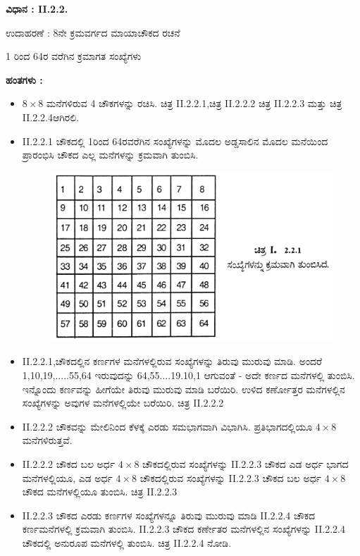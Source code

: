 \noindent \textbf{ವಿಧಾನ : II.2.2.}

ಉದಾಹರಣೆ : 8ನೇ ಕ್ರಮವರ್ಗದ ಮಾಯಾಚೌಕದ ರಚನೆ

1 ರಿಂದ 64ರ ವರೆಗಿನ ಕ್ರಮಾಗತ ಸಂಖ್ಯೆಗಳು

\textbf{ಹಂತಗಳು :}
\begin{itemize}
	\item $8 \times 8$ ಮನೆಗಳಿರುವ 4 ಚೌಕಗಳನ್ನು ರಚಿಸಿ. ಚಿತ್ರ II.2.2.1,ಚಿತ್ರ II.2.2.2 ಚಿತ್ರ II.2.2.3 ಮತ್ತು ಚಿತ್ರ II.2.2.4ಆಗಿರಲಿ.
	\item II.2.2.1 ಚೌಕದಲ್ಲಿ 1ರಿಂದ 64ರವರೆಗಿನ ಸಂಖ್ಯೆಗಳನ್ನು ಮೊದಲ ಅಡ್ಡಸಾಲಿನ \linebreak ಮೊದಲ ಮನೆಯಿಂದ ಪ್ರಾರಂಭಿಸಿ ಚೌಕದ ಎಲ್ಲ ಮನೆಗಳನ್ನು ಕ್ರಮವಾಗಿ ತುಂಬಿಸಿ.
	\begin{figure}[H]
	\includegraphics{src/figures/chap3/fig3-20.jpg}
	\end{figure}
	\item II.2.2.1,ಚೌಕದಲ್ಲಿನ ಕರ್ಣಗಳ ಮನೆಗಳಲ್ಲಿರುವ ಸಂಖ್ಯೆಗಳನ್ನು ತಿರುವು ಮುರುವು ಮಾಡಿ. ಅಂದರೆ 1,10,19,.....55,64 ಇರುವುದನ್ನು 64,55....19.10,1 ಆಗುವಂತೆ - ಅದೇ ಕರ್ಣದ ಮನೆಗಳಲ್ಲಿ ತುಂಬಿಸಿ. ಇನ್ನೊಂದು ಕರ್ಣವನ್ನು ಹೀಗೆಯೇ ತಿರುವು ಮುರುವು ಮಾಡಿ ಬರೆಯಿರಿ. ಉಳಿದ ಕರ್ಣೋತ್ತರ ಮನೆಗಳಲ್ಲಿನ \linebreak ಸಂಖ್ಯೆಗಳನ್ನು ಅವುಗಳ ಮನೆಗಳಲ್ಲಿಯೇ ಬರೆಯಿರಿ. ಚಿತ್ರ II.2.2.2
	\item II.2.2.2 ಚೌಕವನ್ನು ಮೇಲಿನಿಂದ ಕೆಳಕ್ಕೆ ಎರಡು ಸಮಭಾಗವಾಗಿ ವಿಭಾಗಿಸಿ. ಪ್ರತಿಭಾಗದಲ್ಲಿಯೂ $4 \times 8$ ಮನೆಗಳಿರುತ್ತವೆ.
	\item II.2.2.2 ಚೌಕದ ಬಲ ಅರ್ಧ $4 \times 8$ ಚೌಕದಲ್ಲಿರುವ ಸಂಖ್ಯೆಗಳನ್ನು II.2.2.3 ಚೌಕದ ಎಡ ಅರ್ಧ ಭಾಗದ ಮನೆಗಳಲ್ಲಿಯೂ, ಎಡ ಅರ್ಧ $4 \times 8$ ಚೌಕದಲ್ಲಿರುವ ಸಂಖ್ಯೆಗಳನ್ನು II.2.2.3 ಚೌಕದ ಬಲ ಅರ್ಧ $4 \times 8$ ಚೌಕದ ಮನೆಗಳಲ್ಲಿಯೂ ತುಂಬಿಸಿ. ಚಿತ್ರ II.2.2.3
	\item II.2.2.3 ಚೌಕದ ಎರಡು ಕರ್ಣಗಳ ಸಂಖ್ಯೆಗಳನ್ನೂ ತಿರುವು ಮುರುವು ಮಾಡಿ II.2.2.4 ಚೌಕದ ಕರ್ಣಮನೆಗಳಲ್ಲಿ ಕ್ರಮವಾಗಿ ತುಂಬಿಸಿ. II.2.2.3 ಚೌಕದ \linebreak ಕರ್ಣೇತರ ಮನೆಗಳಲ್ಲಿನ ಸಂಖ್ಯೆಗಳನ್ನು II.2.2.4 ಚೌಕದಲ್ಲಿ ಅನುರೂಪ ಮನೆ\-ಗಳಲ್ಲಿ ತುಂಬಿಸಿ. ಚಿತ್ರ II.2.2.4 ನೋಡಿ.


\end{itemize}

